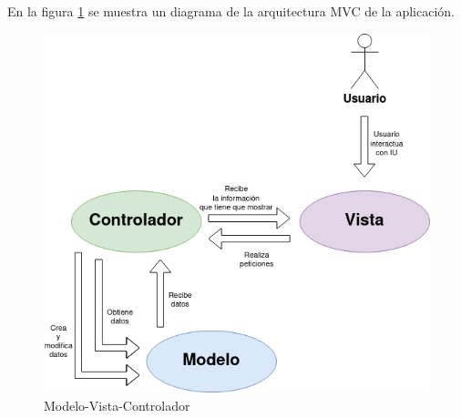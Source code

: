 En la figura \ref{fig:mvc} se muestra un diagrama de la arquitectura MVC de la
aplicación.

\begin{figure}[h]
  \centering
  \includegraphics[width=\textwidth]{diagramas/mvc}
  \caption{Modelo-Vista-Controlador}
  \label{fig:mvc}
\end{figure}
